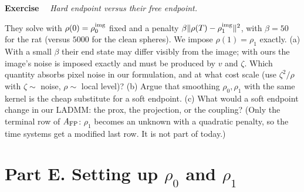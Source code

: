 \documentclass[11pt]{article}
\newcounter{ex}
\newenvironment{ex}[1]{\refstepcounter{ex}\par\medskip\noindent\textbf{Exercise \theex}\ \ \textit{#1}\par\nopagebreak\smallskip}{\par\medskip}
\begin{document}
\begin{ex}{Hard endpoint versus their free endpoint.}
They solve with $\rho(0)=\rho_0^{\rm img}$ fixed and a penalty $\beta\|\rho(T)-\rho_1^{\rm img}\|^2$,
with $\beta=50$ for the rat (versus $5000$ for the clean spheres). We impose
$\rho(1)=\rho_1$ exactly. (a) With a small $\beta$ their end state may differ visibly from
the image; with ours the image's noise is imposed exactly and must be produced by $v$ and
$\zeta$. Which quantity absorbs pixel noise in our formulation, and at what cost scale (use
$\zeta^2/\rho$ with $\zeta\sim$ noise, $\rho\sim$ local level)? (b) Argue that smoothing
$\rho_0,\rho_1$ with the same kernel is the cheap substitute for a soft endpoint. (c) What
would a soft endpoint change in our LADMM: the prox, the projection, or the coupling? (Only
the terminal row of $A_{\rm FP}$: $\rho_1$ becomes an unknown with a quadratic penalty, so
the time systems get a modified last row. It is not part of today.)
\end{ex}

\section*{Part E. Setting up $\rho_0$ and $\rho_1$}
\end{document}
